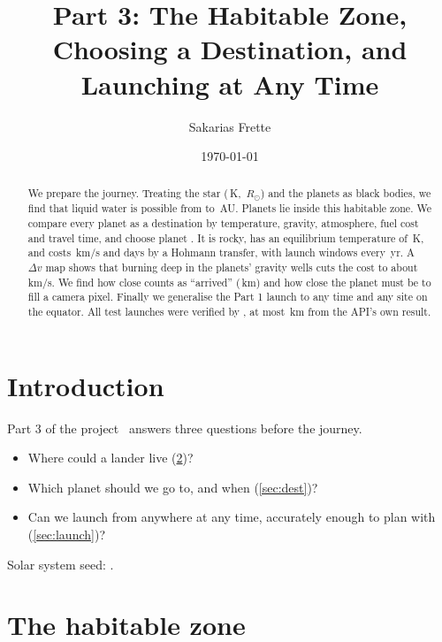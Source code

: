 \documentclass[aps,prd,twocolumn,nofootinbib,floatfix,superscriptaddress]{revtex4-2}
\begin{document}
\title{Part 3: The Habitable Zone, Choosing a Destination, and Launching at Any Time}
\author{Sakarias Frette}
\date{\today}

\begin{abstract}
We prepare the journey.
Treating the star (\,K, \,$R_\odot$) and the planets as black bodies, we find that liquid water is possible from  to \,AU.
Planets  lie inside this habitable zone.
We compare every planet as a destination by temperature, gravity, atmosphere, fuel cost and travel time, and choose planet .
It is rocky, has an equilibrium temperature of \,K, and costs \,km/s and  days by a Hohmann transfer, with launch windows every \,yr.
A $\Delta v$ map shows that burning deep in the planets' gravity wells cuts the cost to about \,km/s.
We find how close counts as ``arrived'' (\,km) and how close the planet must be to fill a camera pixel.
Finally we generalise the Part 1 launch to any time and any site on the equator.
All  test launches were verified by , at most \,km from the API's own result.
\end{abstract}

\maketitle

\section{Introduction}
Part 3 of the project~\cite{ast2000project} answers three questions before the journey.
\begin{itemize}
\item Where could a lander live (\cref{sec:hz})?
\item Which planet should we go to, and when (\cref{sec:dest})?
\item Can we launch from anywhere at any time, accurately enough to plan with (\cref{sec:launch})?
\end{itemize}
Solar system seed: .

\section{The habitable zone}\label{sec:hz}
\end{document}
